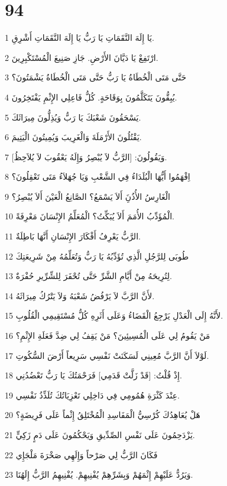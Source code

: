 \chapter{94}

\par 1 يَا إِلَهَ النَّقَمَاتِ يَا رَبُّ يَا إِلَهَ النَّقَمَاتِ أَشْرِقِ.
\par 2 ارْتَفِعْ يَا دَيَّانَ الأَرْضِ. جَازِ صَنِيعَ الْمُسْتَكْبِرِينَ.
\par 3 حَتَّى مَتَى الْخُطَاةُ يَا رَبُّ حَتَّى مَتَى الْخُطَاةُ يَشْمَتُونَ؟
\par 4 يُبِقُّونَ يَتَكَلَّمُونَ بِوَقَاحَةٍ. كُلُّ فَاعِلِي الإِثْمِ يَفْتَخِرُونَ.
\par 5 يَسْحَقُونَ شَعْبَكَ يَا رَبُّ وَيُذِلُّونَ مِيرَاثَكَ.
\par 6 يَقْتُلُونَ الأَرْمَلَةَ وَالْغَرِيبَ وَيُمِيتُونَ الْيَتِيمَ.
\par 7 وَيَقُولُونَ: [الرَّبُّ لاَ يُبْصِرُ وَإِلَهُ يَعْقُوبَ لاَ يُلاَحِظُ].
\par 8 اِفْهَمُوا أَيُّهَا الْبُلَدَاءُ فِي الشَّعْبِ وَيَا جُهَلاَءُ مَتَى تَعْقِلُونَ؟
\par 9 الْغَارِسُ الأُذُنَِ أَلاَ يَسْمَعُ؟ الصَّانِعُ الْعَيْنَ أَلاَ يُبْصِرُ؟
\par 10 الْمُؤَدِّبُ الأُمَمَ أَلاَ يُبَكِّتُ؟ الْمُعَلِّمُ الإِنْسَانَ مَعْرِفَةً.
\par 11 الرَّبُّ يَعْرِفُ أَفْكَارَ الإِنْسَانِ أَنَّهَا بَاطِلَةٌ.
\par 12 طُوبَى لِلرَّجُلِ الَّذِي تُؤَدِّبُهُ يَا رَبُّ وَتُعَلِّمُهُ مِنْ شَرِيعَتِكَ
\par 13 لِتُرِيحَهُ مِنْ أَيَّامِ الشَّرِّ حَتَّى تُحْفَرَ لِلشِّرِّيرِ حُفْرَةٌ.
\par 14 لأَنَّ الرَّبَّ لاَ يَرْفُضُ شَعْبَهُ وَلاَ يَتْرُكُ مِيرَاثَهُ.
\par 15 لأَنَّهُ إِلَى الْعَدْلِ يَرْجِعُ الْقَضَاءُ وَعَلَى أَثَرِهِ كُلُّ مُسْتَقِيمِي الْقُلُوبِ.
\par 16 مَنْ يَقُومُ لِي عَلَى الْمُسِيئِينَ؟ مَنْ يَقِفُ لِي ضِدَّ فَعَلَةِ الإِثْمِ؟
\par 17 لَوْلاَ أَنَّ الرَّبَّ مُعِينِي لَسَكَنَتْ نَفْسِي سَرِيعاً أَرْضَ السُّكُوتِ.
\par 18 إِذْ قُلْتُ: [قَدْ زَلَّتْ قَدَمِي] فَرَحْمَتُكَ يَا رَبُّ تَعْضُدُنِي.
\par 19 عِنْدَ كَثْرَةِ هُمُومِي فِي دَاخِلِي تَعْزِيَاتُكَ تُلَذِّذُ نَفْسِي.
\par 20 هَلْ يُعَاهِدُكَ كُرْسِيُّ الْمَفَاسِدِ الْمُخْتَلِقُ إِثْماً عَلَى فَرِيضَةٍ؟
\par 21 يَزْدَحِمُونَ عَلَى نَفْسِ الصِّدِّيقِ وَيَحْكُمُونَ عَلَى دَمٍ زَكِيٍّ.
\par 22 فَكَانَ الرَّبُّ لِي صَرْحاً وَإِلَهِي صَخْرَةَ مَلْجَإِي
\par 23 وَيَرُدُّ عَلَيْهِمْ إِثْمَهُمْ وَبِشَرِّهِمْ يُفْنِيهِمْ. يُفْنِيهِمُ الرَّبُّ إِلَهُنَا.

